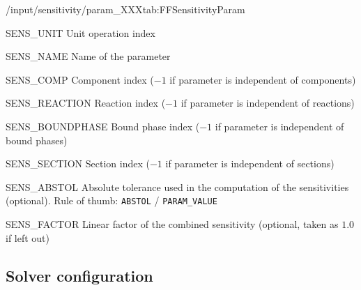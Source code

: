 \begin{groupscope}{/input/sensitivity/param\_XXX}{tab:FFSensitivityParam}
  \begin{dataset}[type = int, range={$\geq 0$}, length={$\geq 1$}]{SENS\_UNIT} 
    Unit operation index  
  \end{dataset}
  \begin{dataset}[type = string, range={See} ,length={$\geq 1$}]{SENS\_NAME} 
    Name of the parameter
  \end{dataset}
  \begin{dataset}[type = int, range={$\geq -1$}, length={$\geq 1$}]{SENS\_COMP} 
    Component index ($-1$ if parameter is independent of components)  
  \end{dataset}
  \begin{dataset}[type = int, range={$\geq -1$}, length={$\geq 1$}]{SENS\_REACTION} 
    Reaction index ($-1$ if parameter is independent of reactions)  
  \end{dataset}
  \begin{dataset}[type = int, range={$\geq -1$}, length={$\geq 1$}]{SENS\_BOUNDPHASE} 
    Bound phase index ($-1$ if parameter is independent of bound phases)  
  \end{dataset}
  \begin{dataset}[type = int, range={$\geq -1$}, length={$\geq 1$}]{SENS\_SECTION} 
    Section index ($-1$ if parameter is independent of sections)  
  \end{dataset}
  \begin{dataset}[type = double, range={$\geq 0.0$}, length={$\geq 1$}]{SENS\_ABSTOL} 
    Absolute tolerance used in the computation of the sensitivities (optional).
    Rule of thumb: \texttt{ABSTOL} / \texttt{PARAM\_VALUE} 
  \end{dataset}
  \begin{dataset}[type = double, range={$\mathds{R}$} ,length={$\geq 1$}]{SENS\_FACTOR} 
    Linear factor of the combined sensitivity (optional, taken as $1.0$ if left out) 
  \end{dataset}
\end{groupscope}

\subsection{Solver configuration}

